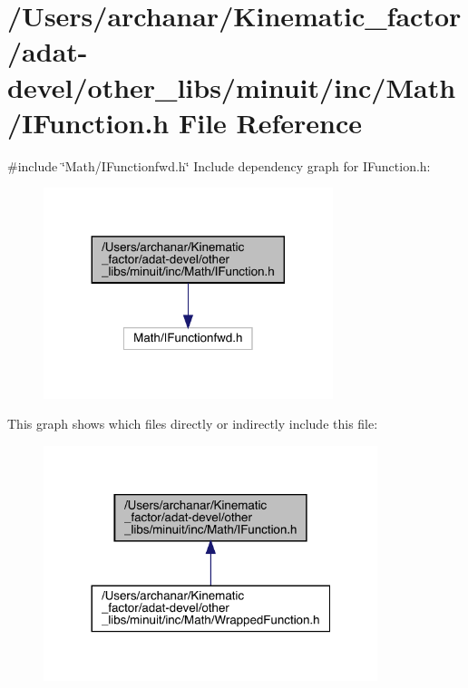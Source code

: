 \hypertarget{adat-devel_2other__libs_2minuit_2inc_2Math_2IFunction_8h}{}\section{/\+Users/archanar/\+Kinematic\+\_\+factor/adat-\/devel/other\+\_\+libs/minuit/inc/\+Math/\+I\+Function.h File Reference}
\label{adat-devel_2other__libs_2minuit_2inc_2Math_2IFunction_8h}
{\ttfamily \#include \char`\"{}Math/\+I\+Functionfwd.\+h\char`\"{}}\newline
Include dependency graph for I\+Function.\+h\+:
\nopagebreak
\begin{figure}[H]
\begin{center}
\leavevmode
\includegraphics[width=239pt]{d0/d92/adat-devel_2other__libs_2minuit_2inc_2Math_2IFunction_8h__incl}
\end{center}
\end{figure}
This graph shows which files directly or indirectly include this file\+:
\nopagebreak
\begin{figure}[H]
\begin{center}
\leavevmode
\includegraphics[width=276pt]{d0/d2f/adat-devel_2other__libs_2minuit_2inc_2Math_2IFunction_8h__dep__incl}
\end{center}
\end{figure}
